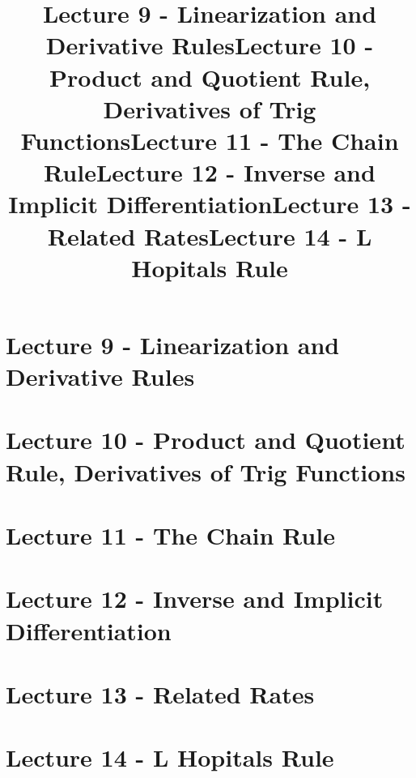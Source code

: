 \documentclass[handout]{ltx-talk}
\begin{document}
\section{Lecture 9 - Linearization and Derivative Rules}
\title{Lecture 9 - Linearization and Derivative Rules}

\section{Lecture 10 - Product and Quotient Rule, Derivatives of Trig Functions}
\title{Lecture 10 - Product and Quotient Rule, Derivatives of Trig Functions}

\section{Lecture 11 - The Chain Rule}
\title{Lecture 11 - The Chain Rule}

\section{Lecture 12 - Inverse and Implicit Differentiation}
\title{Lecture 12 - Inverse and Implicit Differentiation}

\section{Lecture 13 - Related Rates}
\title{Lecture 13 - Related Rates}

\section{Lecture 14 - L Hopitals Rule}
\title{Lecture 14 - L Hopitals Rule}

\printindex
\end{document}

